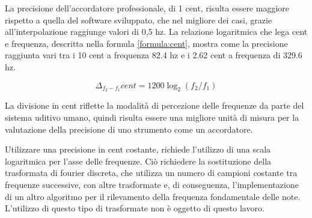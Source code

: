 La precisione dell'accordatore professionale, di 1 cent, risulta essere maggiore rispetto a quella del software sviluppato, che nel migliore dei casi, grazie all'interpolazione raggiunge valori di 0,5 hz.
La relazione logaritmica che lega cent e frequenza, descritta nella formula \ref{formula:cent}, mostra come la precisione raggiunta vari tra i 10 cent a frequenza 82.4 hz e i 2.62 cent a frequenza di 329.6 hz.

\begin{equation}\label{formula:cent}
		\Delta_{f_2-f_1} cent = 1200 \log_2 \left( f_2/f_1 \right)
	\end{equation} 

La divisione in cent riflette la modalità di percezione delle frequenze da parte del sistema uditivo umano, quindi risulta essere una migliore unità di misura per la valutazione della precisione di uno strumento come un accordatore.

Utilizzare una precisione in cent costante, richiede l'utilizzo di una scala logaritmica per l'asse delle frequenze.
Ciò richiedere la sostituzione della trasformata di fourier discreta, che utilizza un numero di campioni costante tra frequenze successive, con altre trasformate e, di conseguenza, l'implementazione di un altro algoritmo per il rilevamento della frequenza fondamentale delle note.
L'utilizzo di questo tipo di trasformate non è oggetto di questo lavoro.

 

